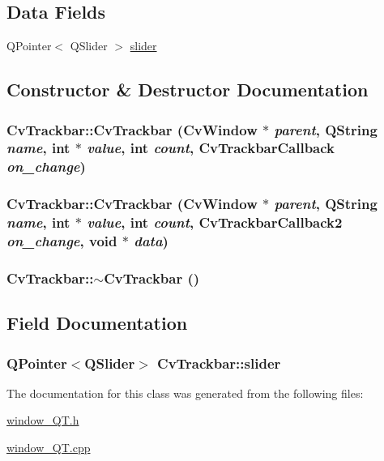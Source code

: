 \subsection*{Data Fields}
\begin{DoxyCompactItemize}
\item 
QPointer$<$ QSlider $>$ \hyperlink{classCvTrackbar_afc7525a204cd578c21b23b842cbe28d8}{slider}
\end{DoxyCompactItemize}


\subsection{Constructor \& Destructor Documentation}
\hypertarget{classCvTrackbar_a5666e87ce86ec7ad97d62b89d148e9bb}{
\subsubsection[{CvTrackbar}]{\setlength{\rightskip}{0pt plus 5cm}CvTrackbar::CvTrackbar ({\bf CvWindow} $\ast$ {\em parent}, \/  QString {\em name}, \/  int $\ast$ {\em value}, \/  int {\em count}, \/  CvTrackbarCallback {\em on\_\-change})}}
\label{classCvTrackbar_a5666e87ce86ec7ad97d62b89d148e9bb}
\hypertarget{classCvTrackbar_a36624a0a15c46a3320ce29f20eda8db8}{
\subsubsection[{CvTrackbar}]{\setlength{\rightskip}{0pt plus 5cm}CvTrackbar::CvTrackbar ({\bf CvWindow} $\ast$ {\em parent}, \/  QString {\em name}, \/  int $\ast$ {\em value}, \/  int {\em count}, \/  CvTrackbarCallback2 {\em on\_\-change}, \/  void $\ast$ {\em data})}}
\label{classCvTrackbar_a36624a0a15c46a3320ce29f20eda8db8}
\hypertarget{classCvTrackbar_ae9bcf438807648149bc24d64d9294ac9}{
\subsubsection[{$\sim$CvTrackbar}]{\setlength{\rightskip}{0pt plus 5cm}CvTrackbar::$\sim$CvTrackbar ()}}
\label{classCvTrackbar_ae9bcf438807648149bc24d64d9294ac9}


\subsection{Field Documentation}
\hypertarget{classCvTrackbar_afc7525a204cd578c21b23b842cbe28d8}{
\subsubsection[{slider}]{\setlength{\rightskip}{0pt plus 5cm}QPointer$<$QSlider$>$ {\bf CvTrackbar::slider}}}
\label{classCvTrackbar_afc7525a204cd578c21b23b842cbe28d8}


The documentation for this class was generated from the following files:\begin{DoxyCompactItemize}
\item 
\hyperlink{window__QT_8h}{window\_\-QT.h}\item 
\hyperlink{window__QT_8cpp}{window\_\-QT.cpp}\end{DoxyCompactItemize}
